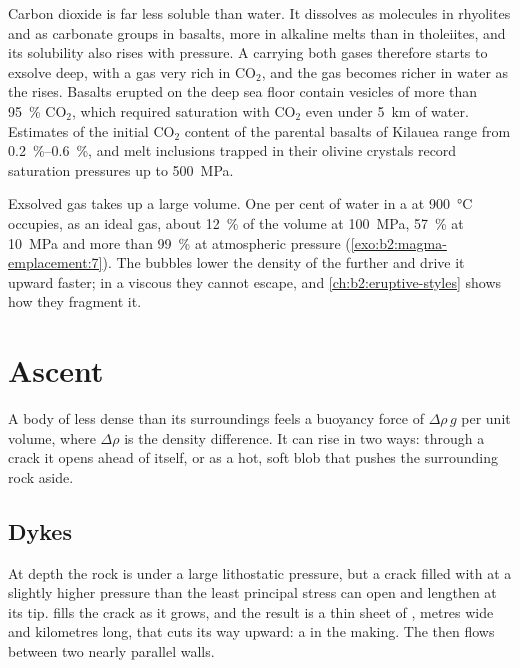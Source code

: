 Carbon dioxide is far less soluble than water. It dissolves as molecules in
rhyolites and as carbonate groups in basalts, more in alkaline melts than in
tholeiites, and its solubility also rises with pressure. A  carrying both
gases therefore starts to exsolve deep, with a gas very rich in CO$_2$, and the
gas becomes richer in water as the  rises. Basalts erupted on the deep sea
floor contain vesicles of more than \qty{95}{\percent} CO$_2$, which required
saturation with CO$_2$ even under \qty{5}{km} of water. Estimates of the initial
CO$_2$ content of the parental basalts of Kilauea range from \qtyrange{0.2}{0.6}{\percent},
and melt inclusions trapped in their olivine crystals record saturation
pressures up to \qty{500}{MPa}.

Exsolved gas takes up a large volume. One per cent of water in a  at
\qty{900}{\celsius} occupies, as an ideal gas, about \qty{12}{\percent} of the
volume at \qty{100}{MPa}, \qty{57}{\percent} at \qty{10}{MPa} and more than
\qty{99}{\percent} at atmospheric pressure (\cref{exo:b2:magma-emplacement:7}). The bubbles lower the
density of the  further and drive it upward faster; in a viscous 
they cannot escape, and \cref{ch:b2:eruptive-styles} shows how they fragment it.

\section{Ascent}

A body of  less dense than its surroundings feels a buoyancy force of
$\Delta\rho\,g$ per unit volume, where $\Delta\rho$ is the density difference. It
can rise in two ways: through a crack it opens ahead of itself, or as a hot,
soft blob that pushes the surrounding rock aside.

\subsection{Dykes}

At depth the rock is under a large lithostatic pressure, but a crack filled
with  at a slightly higher pressure than the least principal stress can
open and lengthen at its tip.  fills the crack as it grows, and the result
is a thin sheet of , metres wide and kilometres long, that cuts its way
upward: a  in the making. The  then flows between two nearly parallel
walls.

